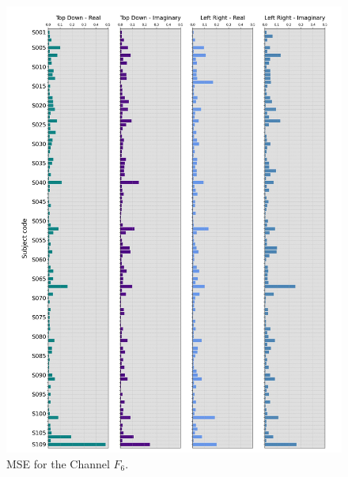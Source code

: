 \documentclass[11pt, aspectratio=169]{beamer}
\begin{document}
\begin{frame}
\begin{figure}[ht]
\begin{minipage}[b]{0.21\linewidth}
    \end{minipage}
    \hspace{0.2cm}
    \begin{minipage}[b]{0.21\linewidth}
      \centering
      \includegraphics[height=.5\paperheight]{../Figures/art_02/Fig11.jpg}
      \caption{MSE for the Channel $F_{6}$.}
      \label{fig22}
    \end{minipage}
    \hspace{0.2cm}
    \begin{minipage}[b]{0.21\linewidth}
      \centering

\end{minipage}
\end{figure}
\end{frame}
\end{document}
